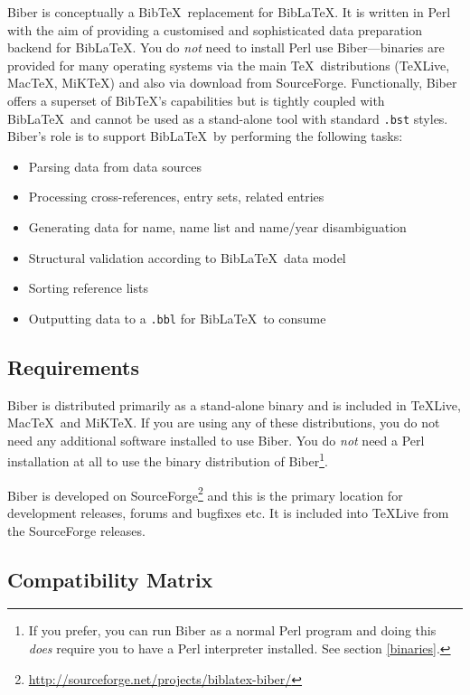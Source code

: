 \documentclass{ltxdockit}
\begin{document}
Biber is conceptually a Bib\TeX\ replacement for
Bib\LaTeX. It is written in Perl with the aim of providing a
customised and sophisticated data preparation backend for Bib\LaTeX.
You do \emph{not} need to install Perl use Biber---binaries
are provided for many operating systems via the main \TeX\
distributions (\TeX Live, Mac\TeX, MiK\TeX) and also via download from SourceForge.
Functionally, Biber offers a superset of Bib\TeX's capabilities but is
tightly coupled with Bib\LaTeX\ and cannot be used as a stand-alone tool
with standard \verb+.bst+ styles. Biber's role is to support
Bib\LaTeX\ by performing the following tasks:

\begin{itemize}
\item Parsing data from data sources
\item Processing cross-references, entry sets, related entries
\item Generating data for name, name list and name/year disambiguation
\item Structural validation according to Bib\LaTeX\ data model
\item Sorting reference lists
\item Outputting data to a \verb+.bbl+ for Bib\LaTeX\ to consume
\end{itemize}

\subsection{Requirements}\label{ref:req}

Biber is distributed primarily as a stand-alone binary and is
included in \TeX Live, Mac\TeX\ and MiK\TeX. If you are using any of these
distributions, you do not need any additional software installed to use
Biber. You do \emph{not} need a Perl installation at all to use
the binary distribution of Biber\footnote{If you prefer, you can run
Biber as a normal Perl program and doing this \emph{does} require
you to have a Perl interpreter installed. See section \ref{binaries}.}.

Biber is developed on
SourceForge\footnote{\url{http://sourceforge.net/projects/biblatex-biber/}}
and this is the primary location for development releases, forums and
bugfixes etc. It is included into \TeX Live from the SourceForge releases.

\subsection{Compatibility Matrix}
\end{document}
